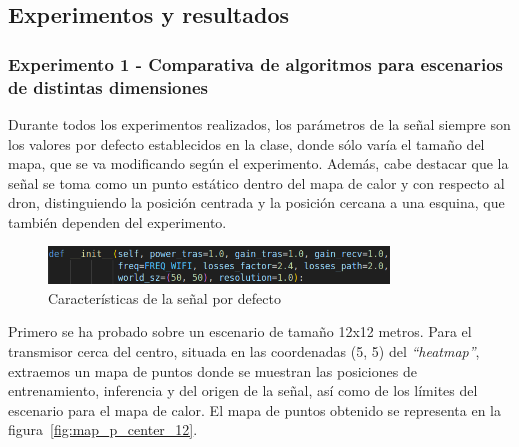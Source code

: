 \subsection{Experimentos y resultados}
\label{subsec:experimentos_sf}

\subsubsection{Experimento 1 - Comparativa de algoritmos para escenarios de distintas dimensiones}
\label{subsubsec:experimentos_1}

Durante todos los experimentos realizados, los parámetros de la señal siempre son los valores por defecto establecidos en la clase, donde sólo varía el tamaño del mapa, que se va modificando según el experimento. Además, cabe destacar que la señal se toma como un punto estático dentro del mapa de calor y con respecto al dron, distinguiendo la posición centrada y la posición cercana a una esquina, que también dependen del experimento.\\

\begin{figure} [t]
    \begin{center}
    \includegraphics[height=1cm]{imagenes/cap4/16_default_values.png}
    \end{center}
    \caption[Características de la señal por defecto]{Características de la señal por defecto}
    \label{fig:compare_graph}
\end{figure}

Primero se ha probado sobre un escenario de tamaño 12x12 metros. Para el transmisor cerca del centro, situada en las coordenadas (5, 5) del \emph{``heatmap''}, extraemos un mapa de puntos donde se muestran las posiciones de entrenamiento, inferencia y del origen de la señal, así como de los límites del escenario para el mapa de calor. El mapa de puntos obtenido se representa en la figura~\ref{fig:map_p_center_12}.\\

